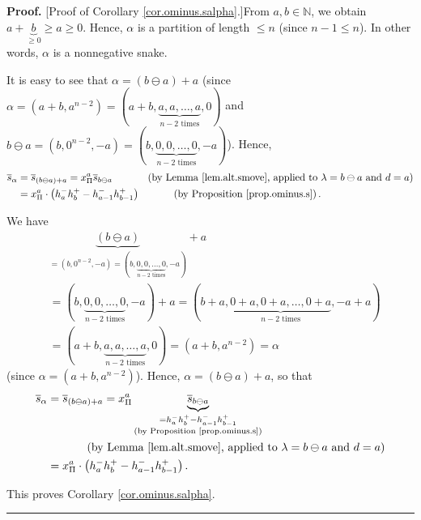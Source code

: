 \documentclass[numbers=enddot,12pt,final,onecolumn,notitlepage]{scrartcl}%
\theoremstyle{definition}
\newenvironment{proof}[1][Proof]{\noindent\textbf{#1.} }{\ \rule{0.5em}{0.5em}}
\newenvironment{verlong}{}{}
\newenvironment{vershort}{}{}
\begin{document}
\begin{proof}
[Proof of Corollary \ref{cor.ominus.salpha}.]From $a,b\in\mathbb{N}$, we
obtain $a+\underbrace{b}_{\geq0}\geq a\geq0$. Hence, $\alpha$ is a partition
of length $\leq n$ (since $n-1\leq n$). In other words, $\alpha$ is a
nonnegative snake.

\begin{vershort}
It is easy to see that $\alpha=\left(  b\ominus a\right)  +a$ (since
$\alpha=\left(  a+b,a^{n-2}\right)  =\left(  a+b,\underbrace{a,a,\ldots
,a}_{n-2\text{ times}},0\right)  $ and $b\ominus a=\left(  b,0^{n-2}%
,-a\right)  =\left(  b,\underbrace{0,0,\ldots,0}_{n-2\text{ times}},-a\right)
$). Hence,%
\begin{align*}
\overline{s}_{\alpha}  &  =\overline{s}_{\left(  b\ominus a\right)  +a}%
=x_{\Pi}^{a}\overline{s}_{b\ominus a}\ \ \ \ \ \ \ \ \ \ \left(  \text{by
Lemma \ref{lem.alt.smove}, applied to }\lambda=b\ominus a\text{ and
}d=a\right) \\
&  =x_{\Pi}^{a}\cdot\left(  h_{a}^{-}h_{b}^{+}-h_{a-1}^{-}h_{b-1}^{+}\right)
\ \ \ \ \ \ \ \ \ \ \left(  \text{by Proposition \ref{prop.ominus.s}}\right)
.
\end{align*}

\end{vershort}

\begin{verlong}
We have
\begin{align*}
&  \underbrace{\left(  b\ominus a\right)  }_{=\left(  b,0^{n-2},-a\right)
=\left(  b,\underbrace{0,0,\ldots,0}_{n-2\text{ times}},-a\right)  }+a\\
&  =\left(  b,\underbrace{0,0,\ldots,0}_{n-2\text{ times}},-a\right)
+a=\left(  b+a,\underbrace{0+a,0+a,\ldots,0+a}_{n-2\text{ times}},-a+a\right)
\\
&  =\left(  a+b,\underbrace{a,a,\ldots,a}_{n-2\text{ times}},0\right)
=\left(  a+b,a^{n-2}\right)  =\alpha
\end{align*}
(since $\alpha=\left(  a+b,a^{n-2}\right)  $). Hence, $\alpha=\left(  b\ominus
a\right)  +a$, so that%
\begin{align*}
\overline{s}_{\alpha}  &  =\overline{s}_{\left(  b\ominus a\right)  +a}%
=x_{\Pi}^{a}\underbrace{\overline{s}_{b\ominus a}}_{\substack{=h_{a}^{-}%
h_{b}^{+}-h_{a-1}^{-}h_{b-1}^{+}\\\text{(by Proposition \ref{prop.ominus.s})}%
}}\\
&  \ \ \ \ \ \ \ \ \ \ \left(  \text{by Lemma \ref{lem.alt.smove}, applied to
}\lambda=b\ominus a\text{ and }d=a\right) \\
&  =x_{\Pi}^{a}\cdot\left(  h_{a}^{-}h_{b}^{+}-h_{a-1}^{-}h_{b-1}^{+}\right)
.
\end{align*}

\end{verlong}

\noindent This proves Corollary \ref{cor.ominus.salpha}.
\end{proof}
\end{document}
